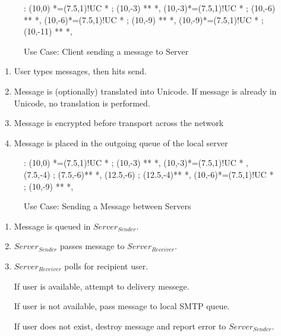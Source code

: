 

\begin{figure}[Hbt]

\xy<1cm,0cm>:
(10,0) *=(7.5,1)!UC *\frm{-} ;
(10,-3) **\dir{-} *\dir{>},
(10,-3)*=(7.5,1)!UC *\frm{=} ; 
(10,-6) **\dir{-} *\dir{>},
(10,-6)*=(7.5,1)!UC *\frm{-} ; 
(10,-9) **\dir{-} *\dir{>},
(10,-9)*=(7.5,1)!UC *\frm{-} ; 
(10,-11) **\dir{=} *\dir{>},
\endxy

\caption{Use Case: Client sending a message to Server}

\end{figure}

\begin{enumerate}

\item User types messages, then hits send.

\item Message is (optionally) translated into Unicode. If message is
already in Unicode, no translation is performed.

\item Message is encrypted before transport across the network

\item Message is placed in the outgoing queue of the local server

\end{enumerate}


\begin{figure}[Hbt]

\xy<1cm,0cm>:
(10,0) *=(7.5,1)!UC *\frm{-} ;
(10,-3) **\dir{-} *\dir{>},
(10,-3)*=(7.5,1)!UC *\frm{-} , 
(7.5,-4) ; (7.5,-6)**\dir{-} *\dir{>},
(12.5,-6) ; (12.5,-4)**\dir{--} *\dir{>},
(10,-6)*=(7.5,1)!UC *\frm{-} ; 
(10,-9) **\dir{=} *\dir{>},
\endxy

\caption{Use Case: Sending a Message between Servers}

\end{figure}

\begin{enumerate}

\item Message is queued in $Server_{Sender}$.

\item $Server_{Sender}$ passes message to $Server_{Receiver}$.

\item $Server_{Receiver}$ polls for recipient user. 

\subitem If user is available, attempt to delivery messege. 

\subitem If user is not available, pass message to local SMTP queue. 

\subitem If user does not exist, destroy message and report error to $Server_{Sender}$.

\end{enumerate}


